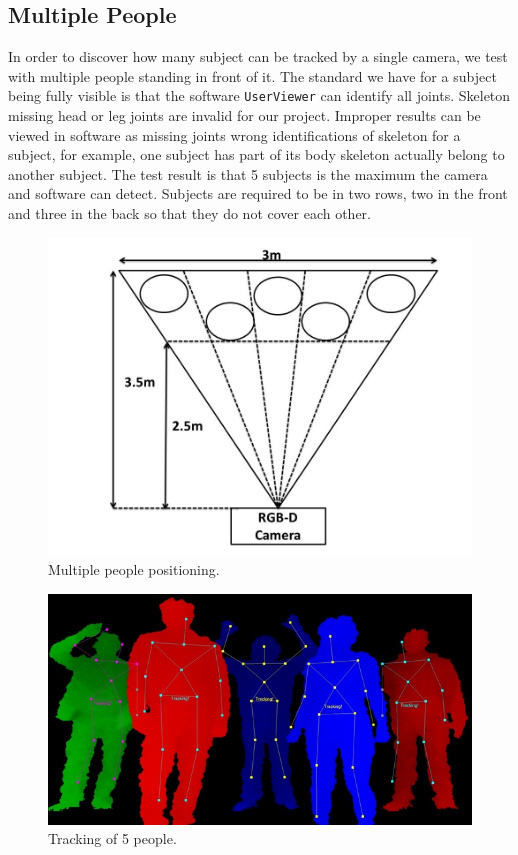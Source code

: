 \documentclass[10pt]{article}
\begin{document}
\subsection{Multiple People}
\noindent
In order to discover how many subject can be tracked by a single camera, we test with multiple people standing in front of it. The standard we have for a subject being fully visible is that the software \texttt{UserViewer} can identify all joints. Skeleton missing head or leg joints are invalid for our project. Improper results can be viewed in software as missing joints wrong identifications of skeleton for a subject, for example, one subject has part of its body skeleton actually belong to another subject. The test result is that 5 subjects is the maximum the camera and software can detect. Subjects are required to be in two rows, two in the front and three in the back so that they do not cover each other.\\
 
\begin{figure}[H]
\centering
\includegraphics[scale=0.3]{multi_people1.jpg}
\caption{Multiple people positioning.}
\end{figure}
 
\begin{figure}[H]
\centering
\includegraphics[scale=0.8]{multi_people2.jpg}
\caption{Tracking of 5 people.}
\end{figure}
 
\end{document}
